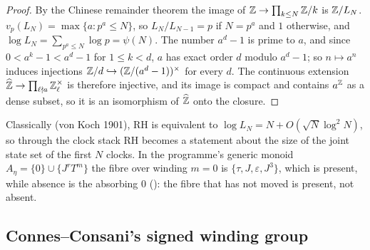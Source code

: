 \begin{proof}
By the Chinese remainder theorem the image of $\mathbb{Z}\to\prod_{k\le N}\mathbb{Z}/k$ is $\mathbb{Z}/L_N$. $v_p(L_N)=\max\{a:p^a\le N\}$, so $L_N/L_{N-1}=p$ if $N=p^a$ and $1$ otherwise, and $\log L_N=\sum_{p^a\le N}\log p=\psi(N)$. The number $a^d-1$ is prime to $a$, and since $0<a^k-1<a^d-1$ for $1\le k<d$, $a$ has exact order $d$ modulo $a^d-1$; so $n\mapsto a^n$ induces injections $\mathbb{Z}/d\hookrightarrow(\mathbb{Z}/(a^d-1))^\times$ for every $d$. The continuous extension $\widehat{\mathbb{Z}}\to\prod_{\ell\nmid a}\mathbb{Z}_\ell^\times$ is therefore injective, and its image is compact and contains $a^{\mathbb{Z}}$ as a dense subset, so it is an isomorphism of $\widehat{\mathbb{Z}}$ onto the closure.
\end{proof}

Classically (von Koch 1901), RH is equivalent to $\log L_N=N+O(\sqrt N\log^2N)$, so through the clock stack RH becomes a statement about the size of the joint state set of the first $N$ clocks.
In the programme's generic monoid $A_\eta=\{0\}\cup\{J^rT^m\}$ the fibre over winding $m=0$ is $\{\tau,J,\varepsilon,J^3\}$, which is present, while absence is the absorbing $0$ (): the fibre that has not moved is present, not absent.

\subsection{Connes--Consani's signed winding group}

